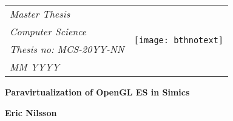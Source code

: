 
\newcommand{\intellogo}[1]{%
	\texttt{[image: Intel-logo.pdf]}%
}
\newcommand{\logossize}{3cm}


{\pagestyle{empty}
\changepage{5cm}{1cm}{-0.5cm}{-0.5cm}{}{-2cm}{}{}{}
\noindent%
{\small
\begin{tabular}{p{} p{}}
\textit{Master Thesis}&\multirow{4}{*}{\texttt{[image: bthnotext]}}\\ %
\textit{Computer Science}\\
\textit{Thesis no: MCS-20YY-NN}\\ %
\textit{MM YYYY}\\ %
\end{tabular}}

\begin{center}
\par\vspace {7cm}
{\Huge\textbf{Paravirtualization of OpenGL ES in Simics}} %
\par\vspace {0.5cm}
{\Large\textbf{}} %
\par\vspace {3cm}
{\Large\textbf{Eric Nilsson}}
\par\vspace {7cm}
\end{center}

\noindent%
\iftoggle{intellogo}{
	{\small
	\begin{tabular}{p{0.75\textwidth} p{0.25\textwidth}}
	Dept. Computer Science \& Engineering&\multirow{4}{*}{\intellogo{\logossize}}\\
	Blekinge Institute of Technology\\
	SE--371 79 Karlskrona, Sweden
	\end{tabular}}
}{
	{\small Dept. Computer Science \& Engineering \\
	Blekinge Institute of Technology\\
	SE--371 79 Karlskrona, Sweden}
}
\clearpage
}


